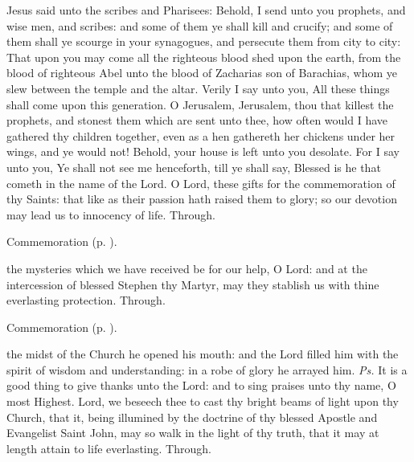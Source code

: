  Jesus said unto the scribes and Pharisees: Behold, I send unto you prophets, and wise men, and scribes: and some of them ye shall kill and crucify; and some of them shall ye scourge in your synagogues, and persecute them from city to city: That upon you may come all the righteous blood shed upon the earth, from the blood of righteous Abel unto the blood of Zacharias son of Barachias, whom ye slew between the temple and the altar. Verily I say unto you, All these things shall come upon this generation. O Jerusalem, Jerusalem, thou that killest the prophets, and stonest them which are sent unto thee, how often would I have gathered thy children together, even as a hen gathereth her chickens under her wings, and ye would not! Behold, your house is left unto you desolate. For I say unto you, Ye shall not see me henceforth, till ye shall say, Blessed is he that cometh in the name of the Lord.
\secret
{} O Lord, these gifts for the commemoration of thy Saints: that like as their passion hath raised them to glory; so our devotion may lead us to innocency of life. Through.

\begin{rubric}
    Commemoration  (p. \pageref{NativityMassIIISecret}).
\end{rubric}


\postcommunion
{} the mysteries which we have received be for our help, O Lord: and at the intercession of blessed Stephen thy Martyr, may they stablish us with thine everlasting protection. Through.

\begin{rubric}
    Commemoration  (p. \pageref{NativityMassIIIPostcommunion}).
\end{rubric}


\clearpage
{}\label{SaintJohn}

\introit
{} the midst of the Church he opened his mouth: and the Lord filled him with the spirit of wisdom and understanding: in a robe of glory he arrayed him. \textit{Ps.} It is a good thing to give thanks unto the Lord: and to sing praises unto thy name, O most Highest.
\collect
{} Lord, we beseech thee to cast thy bright beams of light upon thy Church, that it, being illumined by the doctrine of thy blessed Apostle and Evangelist Saint John, may so walk in the light of thy truth, that it may at length attain to life everlasting. Through.

